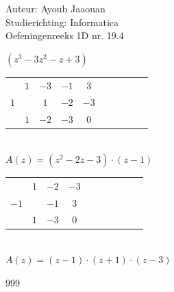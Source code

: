 \documentclass[a4paper]{article}
\begin{document}
  
\noindent \large Auteur: Ayoub Jaaouan          \\
\noindent \large Studierichting: Informatica   \\ 
\noindent \large Oefeningenreeks 1D nr. 19.4   \\

\medskip

\normalsize



$(z^3-3z^2-z+3)$ \\


\begin{tabular}{c|ccccccccc}
		& $1$ & $-3$ & $-1$ & $3$ \\
$1$ 	&     & $1$ & $-2$ & $-3$  \\ \hline
		& $1$ & $-2$ & $-3$& \vline $ 0$ \\
\end{tabular}\\

$A(z) = (z^2-2z-3)\cdot(z-1)$ \\

\begin{tabular}{c|ccccccccc}
		& $1$ & $-2$ & $-3$  \\
$-1$ 	&     & $-1$ & $3$   \\ \hline
		& $1$ & $-3$ & \vline $0$&   \\
\end{tabular}\\

$A(z) = (z-1)\cdot(z+1)\cdot(z-3)$ \\








\begin{thebibliography}{999}
\end{thebibliography}
\end{document}
